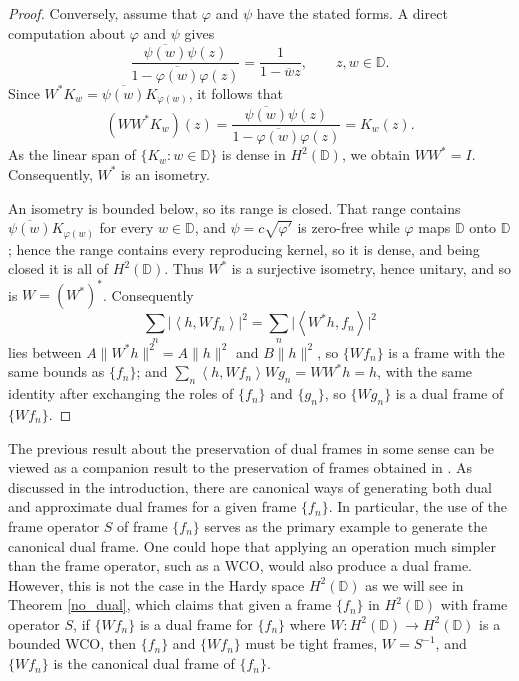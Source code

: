 \documentclass{amsart}
\theoremstyle{definition}
\theoremstyle{remark}
\numberwithin{equation}{section}
\newcommand{\ip}[2]{\left\langle {#1} , {#2} \right\rangle} %
\newcommand{\D}{\mathbb{D}} %
\begin{document}
\begin{proof}
Conversely, assume that $\varphi$ and $\psi$ have the stated forms. A direct
computation about $\varphi$ and $\psi$ gives
\[
    \frac{\overline{\psi(w)}\psi(z)}
    {1-\overline{\varphi(w)}\varphi(z)}
    =\frac{1}{1-\overline{w}z},
    \qquad z,w\in\D.
\]
Since $W^*K_w=\overline{\psi(w)}K_{\varphi(w)}$, it follows that
\[
    (WW^*K_w)(z)
    =\frac{\overline{\psi(w)}\psi(z)}
    {1-\overline{\varphi(w)}\varphi(z)}
    =K_w(z).
\]
As the linear span of $\{K_w:w\in\D\}$ is dense in $H^2(\D)$, we obtain
$WW^*=I$. Consequently, $W^*$ is an isometry.
 
 An isometry is bounded below, so
its range is closed.  That range contains $\overline{\psi(w)}K_{\varphi(w)}$ for
every $w\in\D$, and $\psi=c\sqrt{\varphi'}$ is zero-free while $\varphi$ maps
$\D$ onto $\D$; hence the range contains every reproducing kernel, so it is
dense, and being closed it is all of $H^{2}(\D)$.  Thus $W^{*}$ is a surjective
isometry, hence unitary, and so is $W=(W^{*})^{*}$.  Consequently
\[
  \sum_{n}\bigl|\ip{h}{Wf_n}\bigr|^{2}
  =\sum_{n}\bigl|\ip{W^{*}h}{f_n}\bigr|^{2}
\]
lies between $A\|W^{*}h\|^{2}=A\|h\|^{2}$ and $B\|h\|^{2}$, so $\{Wf_n\}$ is a
frame with the same bounds as $\{f_n\}$; and
$\sum_{n}\ip{h}{Wf_n}Wg_n=WW^{*}h=h$, with the same identity after exchanging
the roles of $\{f_n\}$ and $\{g_n\}$, so $\{Wg_n\}$ is a dual frame of
$\{Wf_n\}$.
\end{proof}

The previous result about the preservation of dual frames in some sense can be viewed as a companion result to the preservation of frames obtained in \cite{manhas2019weighted}. As discussed in the introduction, there are canonical ways of generating both dual and approximate dual frames for a given frame $\{f_{n}\}$. In particular, the use of the frame operator $S$ of frame $\{f_{n}\}$ serves as the primary example to generate the canonical dual frame. One could hope that applying an operation much simpler than the frame operator, such as a WCO, would also produce a dual frame. However, this is not the case in the Hardy space $H^{2}(\mathbb{D})$ as we will see in Theorem \ref{no_dual}, which claims that given a frame $\{f_{n}\}$ in $H^{2}(\mathbb{D})$ with frame operator $S$, if $\{Wf_{n}\}$ is a dual frame for $\{f_{n}\}$ where $W:H^{2}(\mathbb{D})\to H^{2}(\mathbb{D})$ is a bounded WCO,  then $\{f_{n}\}$ and $\{Wf_{n}\}$ must be tight frames, $W = S^{-1}$, and $\{Wf_{n}\}$ is the canonical dual frame of $\{f_{n}\}$.
\end{document}

